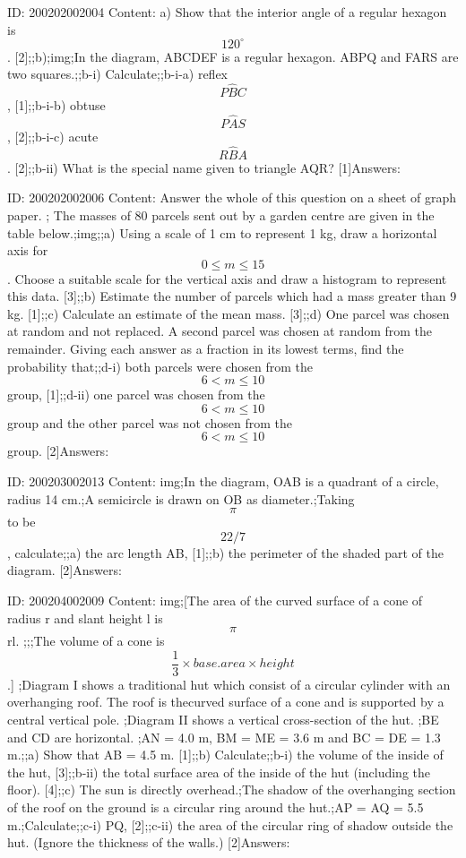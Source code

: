 \documentclass{article}
\begin{document}
ID: 200202002004
Content:
a) Show that the interior angle of a regular hexagon is $$120^{\circ}$$. [2];;b);img;In the diagram, ABCDEF is a regular hexagon. ABPQ and FARS are two squares.;;b-i) Calculate;;b-i-a) reflex $$P \hat BC$$, [1];;b-i-b) obtuse $$P \hat AS$$ , [2];;b-i-c) acute $$R \hat BA$$. [2];;b-ii) What is the special name given to triangle AQR? [1]Answers:

ID: 200202002006
Content:
Answer the whole of this question on a sheet of graph paper. ; The masses of 80 parcels sent out by a garden centre are given in the table below.;img;;a) Using a scale of 1 cm to represent 1 kg, draw a horizontal axis for $$0\leq m\leq 15$$. Choose a suitable scale for the vertical axis and draw a histogram to represent this data. [3];;b) Estimate the number of parcels which had a mass greater than 9 kg. [1];;c) Calculate an estimate of the mean mass. [3];;d) One parcel was chosen at random and not replaced. A second parcel was chosen at random from the remainder. Giving each answer as a fraction in its lowest terms, find the probability that;;d-i) both parcels were chosen from the $$6<m\leq 10$$ group, [1];;d-ii) one parcel was chosen from the $$6<m\leq10$$ group and the other parcel was not chosen from the $$6<m\leq10$$ group. [2]Answers:

ID: 200203002013
Content:
img;In the diagram, OAB is a quadrant of a circle, radius 14 cm.;A semicircle is drawn on OB as diameter.;Taking $$\pi$$ to be $$22/7$$, calculate;;a) the arc length AB,   [1];;b) the perimeter of the shaded part of the diagram.   [2]Answers:

ID: 200204002009
Content:
img;[The area of the curved surface of a cone of radius r and slant height l is $$\pi$$ rl. ;;;The volume of a cone is $$\frac{1}{3} \times base.area \times height$$.] ;Diagram I shows a traditional hut which consist of a circular cylinder with an overhanging roof. The roof is thecurved surface of a cone and is supported by a central vertical pole. ;Diagram II shows a vertical cross-section of the hut. ;BE and CD are horizontal. ;AN = 4.0 m, BM = ME = 3.6 m and BC = DE = 1.3 m.;;a) Show that AB = 4.5 m.   [1];;b) Calculate;;b-i) the volume of the inside of the hut,   [3];;b-ii) the total surface area of the inside of the hut (including the floor).   [4];;c) The sun is directly overhead.;The shadow of the overhanging section of the roof on the ground is a circular ring around the hut.;AP = AQ = 5.5 m.;Calculate;;c-i) PQ,   [2];;c-ii) the area of the circular ring of shadow outside the hut. (Ignore the thickness of the walls.)   [2]Answers:
\end{document}
